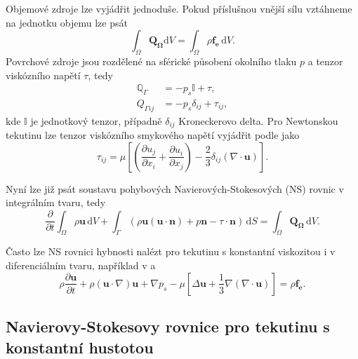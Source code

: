 Objemové zdroje lze vyjádřit jednoduše. Pokud příslušnou vnější sílu vztáhneme na jednotku objemu lze psát
\begin{equation}
\int_{\Omega} \mathbf{Q_\Omega} \mathrm{d}V = \int_{\Omega} \rho \mathbf{f_e} \,\mathrm{d}V.
\end{equation}
Povrchové zdroje jsou rozdělené na sférické působení okolního tlaku $p$ a tenzor viskózního napětí $\tau$, tedy
\begin{align*}
\mathbb{Q}_\Gamma &= -p_s \mathbb{I}+\tau, \\
Q_{\Gamma ij}&= -p_s \delta_{ij}+\tau_{ij},
\end{align*}
kde $\mathbb{I}$ je jednotkový tenzor, případně $\delta_{ij}$ Kroneckerovo delta. Pro Newtonskou tekutinu lze tenzor viskózního smykového napětí vyjádřit podle \cite{hirsch2007numerical} jako 
\begin{equation}
\tau_{ij}=\mu \left[ \left( \dfrac{\partial u_j}{\partial x_i} + \dfrac{\partial u_i}{\partial x_j} \right) - \dfrac{2}{3} \delta_{ij} \left(\nabla \cdot \mathbf{u}\right)  \right].
\end{equation}

Nyní lze již psát soustavu pohybových Navierových-Stokesových (NS) rovnic v integrálním tvaru, tedy 
\begin{equation}
\dfrac{\partial}{\partial t} \int_{\Omega} \rho \mathbf{u} \,\mathrm{d}V + \int_{\Gamma} \left( \rho \mathbf{u} (\mathbf{u}\cdot \mathbf{n}) + p\mathbf{n} - \tau \cdot \mathbf{n}\right) \,\mathrm{d}S = \int_\Omega \mathbf{Q_\Omega} \,\mathrm{d}V.
\end{equation}

Často lze NS rovnici hybnosti nalézt pro tekutinu s konstantní viskozitou i v diferenciálním tvaru, například v \cite{hirsch2007numerical} a \cite{dvorak1987vnitrniaerodynamika}
\begin{equation}
\rho \dfrac{\partial \mathbf{u}}{\partial t} + \rho (\mathbf{u} \cdot \nabla)\mathbf{u} +\nabla p_s - \mu \left[ \Delta \mathbf{u} + \dfrac{1}{3} \nabla(\nabla \cdot \mathbf{u}) \right] = \rho \mathbf{f_e}.
\end{equation}

\subsection{Navierovy-Stokesovy rovnice pro tekutinu s konstantní hustotou}

